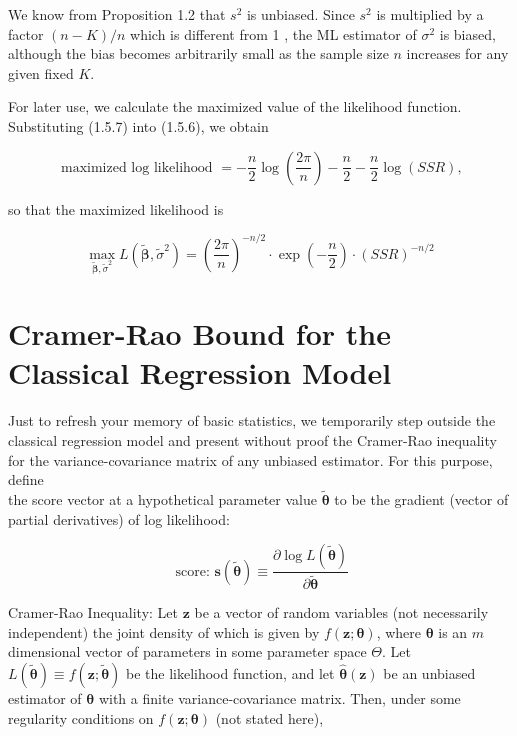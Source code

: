 \documentclass[10pt]{article}
\begin{document}
We know from Proposition 1.2 that $s^{2}$ is unbiased. Since $s^{2}$ is multiplied by a factor $(n-K) / n$ which is different from 1 , the ML estimator of $\sigma^{2}$ is biased, although the bias becomes arbitrarily small as the sample size $n$ increases for any given fixed $K$.

For later use, we calculate the maximized value of the likelihood function. Substituting (1.5.7) into (1.5.6), we obtain

$$
\text { maximized log likelihood }=-\frac{n}{2} \log \left(\frac{2 \pi}{n}\right)-\frac{n}{2}-\frac{n}{2} \log (S S R),
$$

so that the maximized likelihood is


\begin{equation*}
\max _{\widetilde{\boldsymbol{\beta}}, \tilde{\sigma}^{2}} L\left(\widetilde{\boldsymbol{\beta}}, \tilde{\sigma}^{2}\right)=\left(\frac{2 \pi}{n}\right)^{-n / 2} \cdot \exp \left(-\frac{n}{2}\right) \cdot(S S R)^{-n / 2} \tag{1.5.8}
\end{equation*}


\section*{Cramer-Rao Bound for the Classical Regression Model}
Just to refresh your memory of basic statistics, we temporarily step outside the classical regression model and present without proof the Cramer-Rao inequality for the variance-covariance matrix of any unbiased estimator. For this purpose, define\\
the score vector at a hypothetical parameter value $\tilde{\boldsymbol{\theta}}$ to be the gradient (vector of partial derivatives) of log likelihood:


\begin{equation*}
\text { score: } \mathbf{s}(\tilde{\boldsymbol{\theta}}) \equiv \frac{\partial \log L(\tilde{\boldsymbol{\theta}})}{\partial \tilde{\boldsymbol{\theta}}} \tag{1.5.9}
\end{equation*}


Cramer-Rao Inequality: Let $\mathbf{z}$ be a vector of random variables (not necessarily independent) the joint density of which is given by $f(\mathbf{z} ; \boldsymbol{\theta})$, where $\boldsymbol{\theta}$ is an $m$ dimensional vector of parameters in some parameter space $\Theta$. Let $L(\tilde{\boldsymbol{\theta}}) \equiv f(\mathbf{z} ; \tilde{\boldsymbol{\theta}})$ be the likelihood function, and let $\hat{\boldsymbol{\theta}}(\mathbf{z})$ be an unbiased estimator of $\boldsymbol{\theta}$ with a finite variance-covariance matrix. Then, under some regularity conditions on $f(\mathbf{z} ; \boldsymbol{\theta})$ (not stated here),
\end{document}

